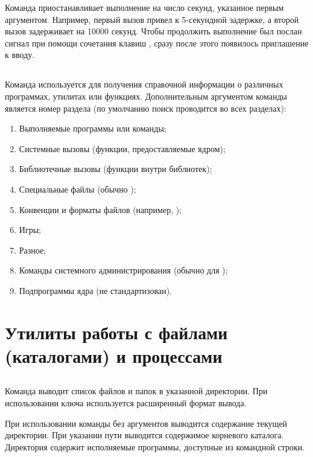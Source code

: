 Команда  приостанавливает выполнение на число секунд, указанное первым аргументом. Например, первый вызов привел к 5-секундной задержке, а второй вызов задерживает на 10000 секунд. Чтобы продолжить выполнение был послан сигнал  при помощи сочетания клавиш , сразу после этого появилось приглашение к вводу.


\subsection{}

Команда  используется для получения справочной информации о различных программах, утилитах или функциях. Дополнительным аргументом команды является номер раздела (по умолчанию поиск проводится во всех разделах):
\begin{enumerate}
	\item Выполняемые программы или  команды;
	\item Системные вызовы (функции, предоставляемые ядром);
	\item Библиотечные вызовы (функции внутри библиотек);
	\item Специальные файлы (обычно );
	\item Конвенции и форматы файлов (например, );
	\item Игры;
	\item Разное;
	\item Команды системного администрирования (обычно для );
	\item Подпрограммы ядра (не стандартизован).
\end{enumerate}


\section{Утилиты работы с файлами (каталогами) и процессами}

\subsection{}

Команда  выводит список файлов и папок в указанной директории. При использовании ключа  используется расширенный формат вывода.


При использовании команды  без аргументов выводится содержание текущей директории. При указании пути  выводится содержимое корневого каталога. Директория  содержит исполняемые программы, доступные из командной строки.


